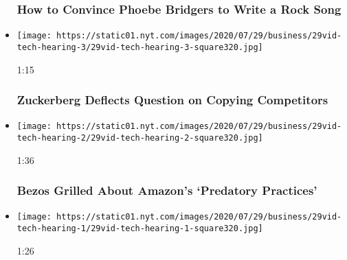 \begin{itemize}
{  \subsubsection{How to Convince Phoebe Bridgers to Write a Rock
  Song}\label{how-to-convince-phoebe-bridgers-to-write-a-rock-song}}
\item
  \href{https://www.nytimes.com/video/us/politics/100000007263272/zuckerberg-jayapal-facebook.html?action=click\&module=video-series-bar\&region=header\&pgtype=Article\&playlistId=video/latest-video}{}

  \texttt{[image: https://static01.nyt.com/images/2020/07/29/business/29vid-tech-hearing-3/29vid-tech-hearing-3-square320.jpg]}

  1:15

  \hypertarget{zuckerberg-deflects-question-on-copying-competitors}{%
  \subsubsection{Zuckerberg Deflects Question on Copying
  Competitors}\label{zuckerberg-deflects-question-on-copying-competitors}}
\item
  \href{https://www.nytimes.com/video/us/100000007263183/bezos-amazon-predatory-practices.html?action=click\&module=video-series-bar\&region=header\&pgtype=Article\&playlistId=video/latest-video}{}

  \texttt{[image: https://static01.nyt.com/images/2020/07/29/business/29vid-tech-hearing-2/29vid-tech-hearing-2-square320.jpg]}

  1:36

  \hypertarget{bezos-grilled-about-amazons-predatory-practices}{%
  \subsubsection{Bezos Grilled About Amazon's `Predatory
  Practices'}\label{bezos-grilled-about-amazons-predatory-practices}}
\item
  \href{https://www.nytimes.com/video/us/politics/100000007263148/google-data-privacy.html?action=click\&module=video-series-bar\&region=header\&pgtype=Article\&playlistId=video/latest-video}{}

  \texttt{[image: https://static01.nyt.com/images/2020/07/29/business/29vid-tech-hearing-1/29vid-tech-hearing-1-square320.jpg]}

  1:26

  \hypertarget{very-easy-for-users-to-be-in-control-of-their-data-google-ceo-says}{%
}
\end{itemize}
